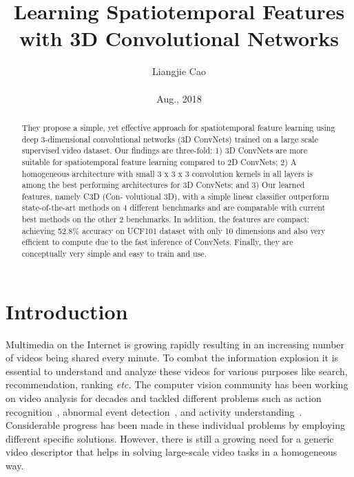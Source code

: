 \documentclass[10pt,twocolumn,letterpaper]{article}
\begin{document}
\title{\textbf{Learning Spatiotemporal Features with 3D Convolutional Networks}}
\author{Liangjie Cao\\\\ Aug., 2018}
\maketitle
\begin{abstract}
They propose a simple, yet effective approach for spatiotemporal feature learning using deep 3-dimensional convolutional networks (3D ConvNets) trained on a large scale supervised video dataset. Our findings are three-fold: 1) 3D ConvNets are more suitable for spatiotemporal feature
learning compared to 2D ConvNets; 2) A homogeneous architecture with small 3 x 3 x 3 convolution kernels in all layers is among the best performing architectures for 3D ConvNets; and 3) Our learned features, namely C3D (Con-
volutional 3D), with a simple linear classifier outperform state-of-the-art methods on 4 different benchmarks and are comparable with current best methods on the other 2 benchmarks. In addition, the features are compact: achieving 52.8\% accuracy on UCF101 dataset with only 10 dimensions and also very efficient to compute due to the fast inference of ConvNets. Finally, they are conceptually very simple and easy to train and use.
\end{abstract}
\section{Introduction}
Multimedia on the Internet is growing rapidly resulting in an increasing number of videos being shared every minute. To combat the information explosion it is essential to understand and analyze these videos for various purposes like search, recommendation, ranking \emph{etc.} The computer vision community has been working on video analysis for decades and tackled different problems such as action recognition~\cite{name28}, abnormal event detection~\cite{name20}, and activity understanding~\cite{name8}. Considerable progress has been made in these individual problems by employing different specific solutions. However, there is still a growing need for a generic video descriptor that helps in solving large-scale video tasks in a homogeneous way.
\end{document}
